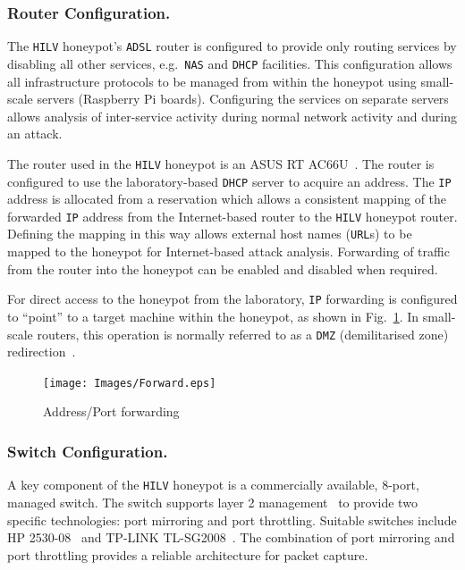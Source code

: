 \documentclass[10pt,journal]{IEEEtran}
\begin{document}
\subsubsection{Router Configuration.}

The \texttt{HILV} honeypot's \texttt{ADSL} router is configured to provide only
routing services by disabling all other services, e.g.\ \texttt{NAS} and
\texttt{DHCP} facilities. This configuration allows all infrastructure
protocols to be managed from within the honeypot using small-scale servers
(Raspberry Pi boards). Configuring the services on separate
servers allows analysis of inter-service activity during normal network
activity and during an attack.

The router used in the \texttt{HILV} honeypot is an ASUS RT
AC66U~\cite{ASUS:17}. The router is configured to use the laboratory-based
\texttt{DHCP} server to acquire an  address. The \texttt{IP} address is
allocated from a reservation which allows a consistent mapping of the forwarded
\texttt{IP} address from the Internet-based router to the \texttt{HILV} honeypot
router. Defining the mapping in this way allows external host names
(\texttt{URL}s) to be mapped to the honeypot for Internet-based attack
analysis. Forwarding of traffic from the router into the honeypot
can be enabled and disabled when required.

For direct access to the honeypot from the laboratory, \texttt{IP} forwarding is
configured to  ``point'' to a target machine within the honeypot,
as shown in Fig.~\ref{fig:Forward}. In small-scale routers, this operation is
normally referred to as a \texttt{DMZ} (demilitarised zone)
redirection~\cite{MB:01}.

\begin{figure}[h]
\begin{center}
	\texttt{[image: Images/Forward.eps]}
\caption{Address/Port forwarding}
\label{fig:Forward}
\end{center}
\end{figure}

\subsubsection{Switch Configuration.}

A key component of the \texttt{HILV} honeypot is a commercially available,
8-port, managed switch. The switch supports layer 2 management~\cite{ST:98} to
provide two specific technologies: port mirroring and port throttling. Suitable
switches include HP 2530-08~\cite{HP:17} and TP-LINK TL-SG2008~\cite{TP:17}.
The combination of port mirroring and port throttling provides a reliable architecture
for packet capture. 
\end{document}
